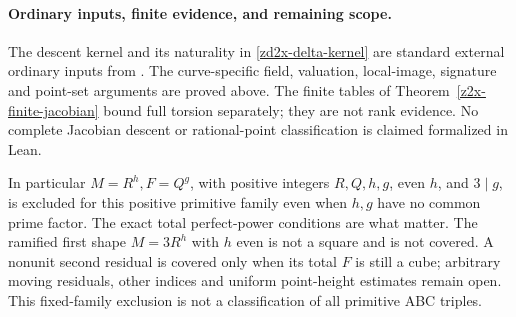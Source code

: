 \paragraph{Ordinary inputs, finite evidence, and remaining scope.}
The descent kernel and its naturality in
\eqref{zd2x-delta-kernel} are standard external
ordinary inputs from \cite{StollTwoDescent2001}.
The curve-specific field, valuation, local-image,
signature and point-set arguments are proved
above. The finite tables of
Theorem~\ref{z2x-finite-jacobian} bound full
torsion separately; they are not rank evidence.
No complete Jacobian descent or rational-point
classification is claimed formalized in Lean.

In particular \(M=R^h,F=Q^g\), with positive integers
\(R,Q,h,g\), even \(h\), and \(3\mid g\), is excluded for this
positive primitive family even when \(h,g\)
have no common prime factor. The exact total
perfect-power conditions are what matter.
The ramified first shape \(M=3R^h\) with \(h\)
even is not a square and is not covered.
A nonunit second residual is covered only
when its total \(F\) is still a cube; arbitrary
moving residuals, other indices and uniform
point-height estimates remain open.
This fixed-family exclusion is not a
classification of all primitive ABC triples.
